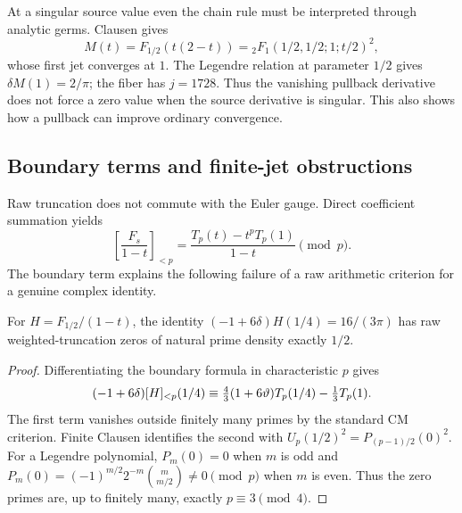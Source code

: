 At a singular source value even the chain rule must be interpreted
through analytic germs. Clausen gives
\[
 M(t)=F_{1/2}(t(2-t))={}_2F_1(1/2,1/2;1;t/2)^2,
\]
whose first jet converges at $1$. The Legendre relation at parameter
$1/2$ gives $\delta M(1)=2/\pi$; the fiber has $j=1728$.
Thus the vanishing pullback derivative does not force a zero value
when the source derivative is singular. This also shows how a
pullback can improve ordinary convergence.

\subsection{Boundary terms and finite-jet obstructions}
Raw truncation does not commute with the Euler gauge. Direct
coefficient summation yields
\[
 \left[\frac{F_s}{1-t}\right]_{<p}
       =\frac{T_p(t)-t^pT_p(1)}{1-t}\pmod p.
\]
The boundary term explains the following failure of a raw arithmetic
criterion for a genuine complex identity.

\begin{proposition}
\label{prop:euler-raw-density-obstruction}
For $H=F_{1/2}/(1-t)$, the identity
$(-1+6\delta)H(1/4)=16/(3\pi)$ has raw weighted-truncation zeros
of natural prime density exactly $1/2$.
\end{proposition}
\begin{proof}
Differentiating the boundary formula in characteristic $p$ gives
\[
 (-1+6\delta)[H]_{<p}(1/4)
 \equiv\tfrac43(1+6\vartheta)T_p(1/4)-\tfrac13T_p(1).
\]
The first term vanishes outside finitely many primes by the standard
CM criterion. Finite Clausen identifies the second with
$U_p(1/2)^2=P_{(p-1)/2}(0)^2$. For a Legendre polynomial,
$P_m(0)=0$ when $m$ is odd and
$P_m(0)=(-1)^{m/2}2^{-m}\binom m{m/2}\ne0\pmod p$
when $m$ is even. Thus the zero primes are, up to finitely many,
exactly $p\equiv3\pmod4$.
\end{proof}

